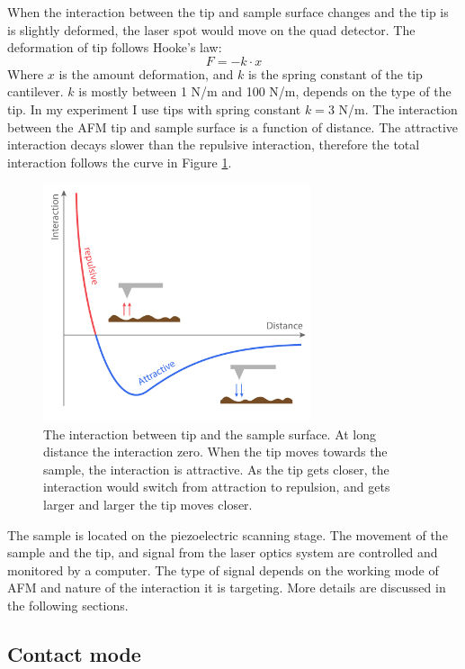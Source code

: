 \documentclass[pdflatex, sectionletters, 12pt]{pittetd}    %
\begin{document}
When the interaction between the tip and sample surface changes and the tip is is slightly deformed, the laser spot would move on the quad detector. The deformation of tip follows Hooke's law:
$$F = -k \cdot x$$
Where $x$ is the amount deformation, and $k$ is the spring constant of the tip cantilever. $k$ is mostly between 1 N/m and 100 N/m, depends on the type of the tip. In my experiment I use tips with spring constant $k = 3$ N/m. The interaction between the AFM tip and sample surface is a function of distance. The attractive interaction decays slower than the repulsive interaction, therefore the total interaction follows the curve in Figure \ref{FIG:Interaction}.

\begin{figure}[h!]
	\centering
	\includegraphics[width=0.7\textwidth]{Drawing/Interaction.pdf}
	\caption{The interaction between tip and the sample surface. At long distance the interaction zero. When the tip moves towards the sample, the interaction is attractive. As the tip gets closer, the interaction would switch from attraction to repulsion, and gets larger and larger the tip moves closer.}
	\label{FIG:Interaction}
\end{figure}

The sample is located on the piezoelectric scanning stage. The movement of the sample and the tip, and signal from the laser optics system are controlled and monitored by a computer. The type of signal depends on the working mode of AFM and nature of the interaction it is targeting. More details are discussed in the following sections. 

\subsection{Contact mode}
\end{document}
